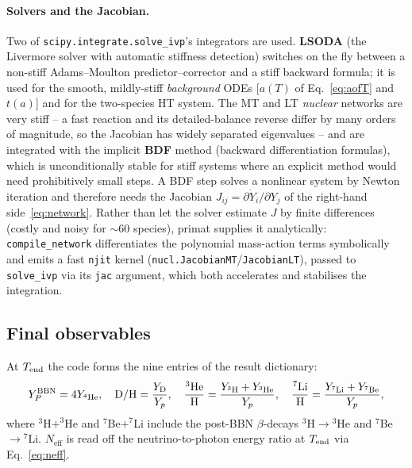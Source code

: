 \documentclass[11pt,a4paper]{article}
\newcommand{\Neff}{N_{\mathrm{eff}}}
\newcommand{\YP}{Y_P}
\newcommand{\DoH}{\mathrm{D/H}}
\newcommand{\code}[1]{\texttt{#1}}
\begin{document}
\paragraph{Solvers and the Jacobian.}
Two of \code{scipy.integrate.solve\_ivp}'s integrators are used. \textbf{LSODA}
(the Livermore solver with automatic stiffness detection) switches on the fly
between a non-stiff Adams--Moulton predictor--corrector and a stiff backward
formula; it is used for the smooth, mildly-stiff \emph{background} ODEs
[$a(T)$ of Eq.~\eqref{eq:aofT} and $t(a)$] and for the two-species HT system.
The MT and LT \emph{nuclear} networks are very stiff -- a fast reaction and its
detailed-balance reverse differ by many orders of magnitude, so the Jacobian has
widely separated eigenvalues -- and are integrated with the implicit
\textbf{BDF} method (backward differentiation formulas), which is
unconditionally stable for stiff systems where an explicit method would need
prohibitively small steps. A BDF step solves a nonlinear system by Newton
iteration and therefore needs the Jacobian
$J_{ij}=\partial\dot Y_i/\partial Y_j$ of the right-hand
side~\eqref{eq:network}. Rather than let the solver estimate $J$ by finite
differences (costly and noisy for $\sim$60 species), primat supplies it
analytically: \code{compile\_network} differentiates the polynomial mass-action
terms symbolically and emits a fast \code{njit} kernel
(\code{nucl.JacobianMT}/\code{JacobianLT}), passed to \code{solve\_ivp} via its
\code{jac} argument, which both accelerates and stabilises the integration.

\subsection{Final observables}\label{sec:obs}
At $T_{\rm end}$ the code forms the nine entries of the result dictionary:
\begin{equation}
  \YP^{\rm BBN}=4Y_{^4{\rm He}},\quad
  \DoH=\frac{Y_{\rm D}}{Y_p},\quad
  \frac{^3{\rm He}}{\rm H}=\frac{Y_{^3{\rm H}}+Y_{^3{\rm He}}}{Y_p},\quad
  \frac{^7{\rm Li}}{\rm H}=\frac{Y_{^7{\rm Li}}+Y_{^7{\rm Be}}}{Y_p},
\end{equation}
where $^3$H$+^3$He and $^7$Be$+^7$Li include the post-BBN $\beta$-decays
$^3$H$\to{}^3$He and $^7$Be$\to{}^7$Li. $\Neff$ is read off the
neutrino-to-photon energy ratio at $T_{\rm end}$ via Eq.~\eqref{eq:neff}.
\end{document}
